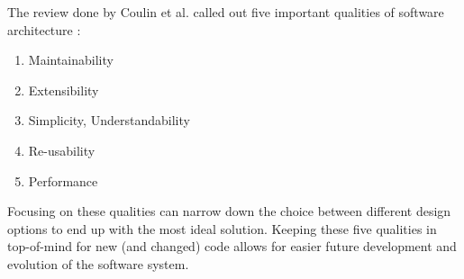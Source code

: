 The review done by Coulin et al. called out five important qualities of software architecture \cite{coulin:2019}:

\vspace{0.25cm}
\begin{enumerate}
    \item Maintainability
    \item Extensibility
    \item Simplicity, Understandability
    \item Re-usability
    \item Performance
\end{enumerate}
\vspace{0.25cm}

Focusing on these qualities can narrow down the choice between different design options to end up with the most ideal solution. Keeping these five qualities in top-of-mind for new (and changed) code allows for easier future development and evolution of the software system.

